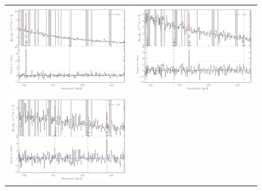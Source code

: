 \begin{figure}[h]
  \begin{tabular}{ll}
    \begin{minipage}{3.25in}
      \begin{center}
	\includegraphics[width=3.25in]{simgal_z060.pdf}
      \end{center}
    \end{minipage} &
    \begin{minipage}{3.25in}
      \begin{center}
	\includegraphics[width=3.25in]{simgal_z100.pdf}
      \end{center}
    \end{minipage} \\
    \begin{minipage}{3.25in}
      \begin{center}
	\includegraphics[width=3.25in]{simgal_z148.pdf}

\end{center}
\end{minipage}
\end{tabular}
\end{figure}
